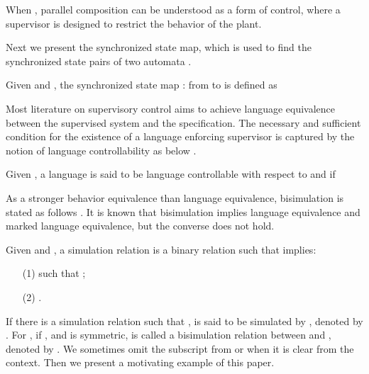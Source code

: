 \documentclass[preprint,authoryear,12pt]{elsarticle}
\begin{document}
When , parallel composition can be understood
as a form of control, where a supervisor is designed to restrict
the behavior of the plant.

Next we present the synchronized state map, which is used to find
the synchronized state pairs of two automata
\citep{zhou2006control}.

\begin{Definition}
Given  and , the synchronized state
map :  from  to 
is defined as

\end{Definition}








Most literature on supervisory control aims to achieve language
equivalence between the supervised system and the specification.
The necessary and sufficient condition for the existence of a
language enforcing supervisor is captured by the notion of
language controllability as below \citep{ramadge1987supervisory}.


\begin{Definition}\label{langc}
Given , a language  is said to be language controllable with respect to 
and  if

\end{Definition}






As a stronger behavior equivalence than language equivalence,
bisimulation is stated as follows \citep{milner1989communication}.
It is known that bisimulation implies language equivalence and
marked language equivalence, but the converse does not hold.


\begin{Definition}
Given  and , a simulation relation
 is a binary relation  such
that  implies:
\begin{enumerate}
\item[(1)]  such that ;

\item[(2)] .
\end{enumerate}
\end{Definition}

If there is a simulation relation    such that ,  is said to be
simulated by , denoted by . For
, if ,  and  is symmetric, 
is called a bisimulation relation between  and ,
denoted by . We sometimes omit the
subscript  from  or  when it is
clear from the context. Then we present a motivating example of
this paper.
\end{document}
